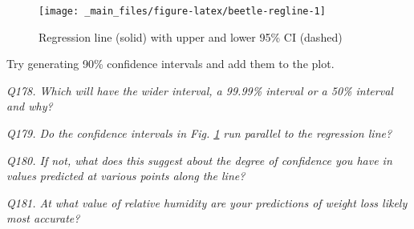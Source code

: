 \documentclass[
  11pt,
  a4paper,
]{book}
\newenvironment{Shaded}{\begin{snugshade}}{\end{snugshade}}
\newcommand{\AttributeTok}[1]{\textcolor[rgb]{0.77,0.63,0.00}{#1}}
\newcommand{\DecValTok}[1]{\textcolor[rgb]{0.00,0.00,0.81}{#1}}
\newcommand{\FloatTok}[1]{\textcolor[rgb]{0.00,0.00,0.81}{#1}}
\newcommand{\FunctionTok}[1]{\textcolor[rgb]{0.00,0.00,0.00}{#1}}
\newcommand{\NormalTok}[1]{#1}
\newcommand{\OtherTok}[1]{\textcolor[rgb]{0.56,0.35,0.01}{#1}}
\newcommand{\SpecialCharTok}[1]{\textcolor[rgb]{0.00,0.00,0.00}{#1}}
\newcommand{\StringTok}[1]{\textcolor[rgb]{0.31,0.60,0.02}{#1}}
\begin{document}
\begin{Shaded}
\end{Shaded}

\begin{figure}

{\centering \texttt{[image: \_main\_files/figure-latex/beetle-regline-1]} 

}

\caption{Regression line (solid) with upper and lower 95\% CI (dashed)}\label{fig:beetle-regline}
\end{figure}

Try generating 90\% confidence intervals and add them to the plot.

\emph{Q178. Which will have the wider interval, a 99.99\% interval or a 50\% interval and why?}

\emph{Q179. Do the confidence intervals in Fig. \ref{fig:beetle-regline} run parallel to the regression line?}

\emph{Q180. If not, what does this suggest about the degree of confidence you have in values predicted at various points along the line?}

\emph{Q181. At what value of relative humidity are your predictions of weight loss likely most accurate?}
\end{document}
